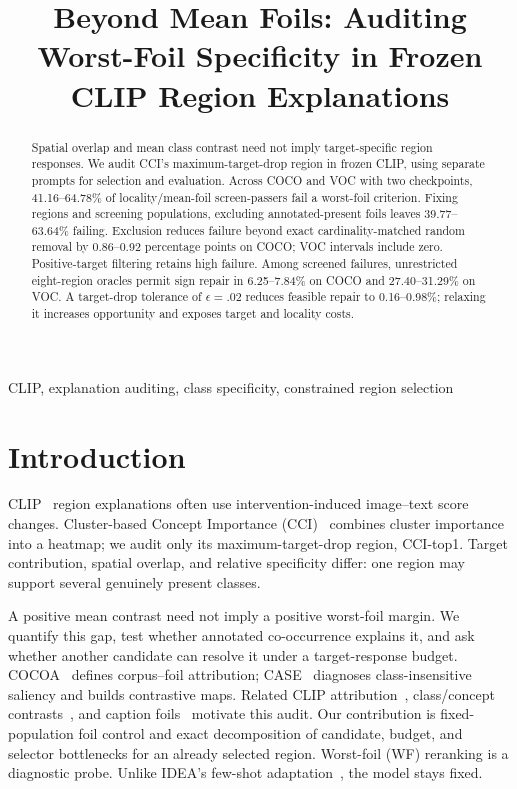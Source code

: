 \documentclass[10pt]{article}
\title{Beyond Mean Foils: Auditing Worst-Foil Specificity in Frozen CLIP Region Explanations}
\begin{document}
\maketitle
\begin{abstract}
Spatial overlap and mean class contrast need not imply target-specific region
responses. We audit CCI's maximum-target-drop region in frozen CLIP, using
separate prompts for selection and evaluation. Across COCO and VOC with two
checkpoints, 41.16--64.78\% of locality/mean-foil screen-passers fail a worst-foil
criterion. Fixing regions and screening populations, excluding annotated-present
foils leaves 39.77--63.64\% failing. Exclusion reduces failure beyond exact
cardinality-matched random removal by 0.86--0.92 percentage points on COCO;
VOC intervals include zero. Positive-target filtering retains high failure.
Among screened failures, unrestricted eight-region oracles permit sign repair
in 6.25--7.84\% on COCO and 27.40--31.29\% on VOC. A target-drop tolerance
of $\epsilon=.02$ reduces feasible repair to 0.16--0.98\%; relaxing it increases
opportunity and exposes target and locality costs.
\end{abstract}
\begin{keywords}
CLIP, explanation auditing, class specificity, constrained region selection
\end{keywords}

\section{Introduction}
CLIP~\cite{radford2021clip} region explanations often use intervention-induced
image--text score changes. Cluster-based Concept Importance
(CCI)~\cite{agarwal2025cci} combines cluster importance
into a heatmap; we audit only its maximum-target-drop region, CCI-top1.
Target contribution, spatial overlap, and relative specificity differ:
one region may support several genuinely present classes.

A positive mean contrast need not imply a positive worst-foil margin.
We quantify this gap, test whether annotated co-occurrence explains it,
and ask whether another candidate can resolve it under a target-response budget.
COCOA~\cite{lin2023cocoa} defines corpus--foil attribution;
CASE~\cite{williamson2025case} diagnoses class-insensitive saliency and builds
contrastive maps. Related CLIP attribution~\cite{wang2023m2ib,li2023clipsurgery,dreyer2025cliplatent},
class/concept contrasts~\cite{li2026cdaclip,cheng2026mgaclip,visser2026contrastiveconcept},
and caption foils~\cite{yuksekgonul2023aro} motivate this audit.
Our contribution is fixed-population foil control and exact decomposition
of candidate, budget, and selector bottlenecks for an already selected region.
Worst-foil (WF) reranking is a diagnostic probe. Unlike IDEA's few-shot
adaptation~\cite{ye2026idea}, the model stays fixed.
\end{document}
